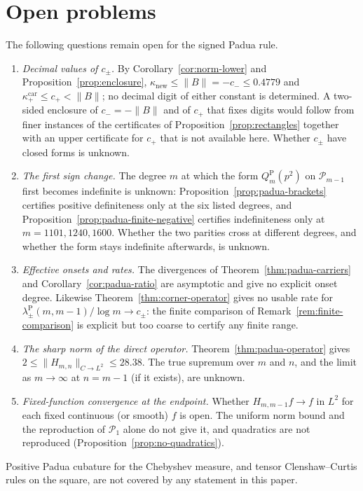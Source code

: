 \documentclass[preprint,12pt,a4paper]{elsarticle}
\theoremstyle{remark}
\newcommand{\Pa}{\mathrm P}
\begin{document}
\section{Open problems}\label{sec:open}

The following questions remain open for the signed Padua rule.
\begin{enumerate}
\item \emph{Decimal values of $c_\pm$.} By Corollary~\ref{cor:norm-lower}
 and Proposition~\ref{prop:enclosure},
 $\kappa_{\mathrm{new}}\le\|B\|=-c_-\le0.4779$ and
 $\kappa^{\mathrm{car}}_+\le c_+<\|B\|$; no decimal digit of either constant
 is determined. A two-sided enclosure of $c_-=-\|B\|$ and of $c_+$ that fixes
 digits would follow from finer instances of the certificates of
 Proposition~\ref{prop:rectangles} together with an upper certificate for $c_+$
 that is not available here. Whether $c_\pm$ have closed forms is unknown.
\item \emph{The first sign change.} The degree $m$ at which the form
 $Q_m^\Pa(p^2)$ on $\mathcal P_{m-1}$ first becomes indefinite is unknown:
 Proposition~\ref{prop:padua-brackets} certifies positive definiteness
 only at the six listed degrees, and Proposition~\ref{prop:padua-finite-negative}
 certifies indefiniteness only at $m=1101,1240,1600$. Whether the two parities
 cross at different degrees, and whether the form stays indefinite afterwards,
 is unknown.
\item \emph{Effective onsets and rates.} The divergences of
 Theorem~\ref{thm:padua-carriers} and Corollary~\ref{cor:padua-ratio} are
 asymptotic and give no explicit onset degree. Likewise
 Theorem~\ref{thm:corner-operator} gives no usable rate for
 $\lambda^\Pa_\pm(m,m-1)/\log m\to c_\pm$: the finite comparison of
 Remark~\ref{rem:finite-comparison} is explicit but too coarse to certify any
 finite range.
\item \emph{The sharp norm of the direct operator.} Theorem~\ref{thm:padua-operator}
 gives $2\le\|H_{m,n}\|_{C\to L^2}\le28.38$. The true supremum over $m$ and $n$,
 and the limit as $m\to\infty$ at $n=m-1$ (if it exists), are unknown.
\item \emph{Fixed-function convergence at the endpoint.} Whether
 $H_{m,m-1}f\to f$ in $L^2$ for each fixed continuous (or smooth) $f$ is open.
 The uniform norm bound and the reproduction of $\mathcal P_1$ alone do not give
 it, and quadratics are not reproduced
 (Proposition~\ref{prop:no-quadratics}).
\end{enumerate}
Positive Padua cubature for the Chebyshev measure, and tensor
Clenshaw--Curtis rules on the square, are not covered by any statement in this paper.
\end{document}
